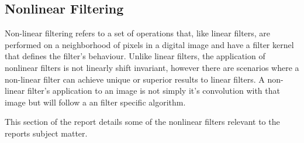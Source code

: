 \subsection{Nonlinear Filtering}

Non-linear filtering refers to a set of operations that, like linear filters, are performed on a neighborhood of pixels in a digital image and have a filter kernel that defines the filter's behaviour. Unlike linear filters, the application of nonlinear filters is not linearly shift invariant, however there are scenarios where a non-linear filter can achieve unique or superior results to linear filters. A non-linear filter's application to an image is not simply it's convolution with that image but will follow a an filter specific algorithm. 

This section of the report details some of the nonlinear filters relevant to the reports subject matter.



